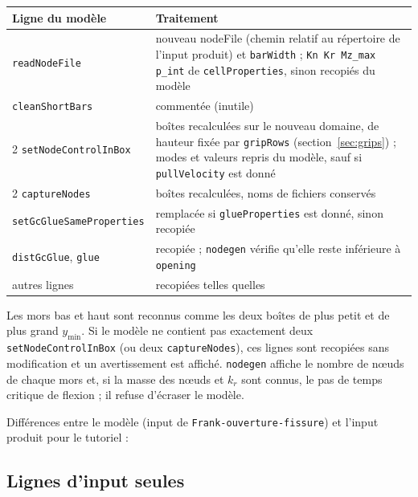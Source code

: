 \documentclass[11pt,a4paper]{article}
\newcommand{\code}[1]{\texttt{#1}}
\newcommand{\toolgen}{\code{nodegen}}
\begin{document}
\begin{center}
\small
\begin{tabular}{@{}lp{10.4cm}@{}}
  \toprule
  Ligne du modèle & Traitement \\
  \midrule
  \code{readNodeFile} & nouveau nodeFile (chemin relatif au répertoire de l'input produit) et \code{barWidth} ;
    \code{Kn Kr Mz\_max p\_int} de \code{cellProperties}, sinon recopiés du modèle \\
  \code{cleanShortBars} & commentée (inutile) \\
  2 \code{setNodeControlInBox} & boîtes recalculées sur le nouveau domaine, de hauteur fixée par \code{gripRows}
    (section~\ref{sec:grips}) ; modes et valeurs repris du modèle, sauf si \code{pullVelocity} est donné \\
  2 \code{captureNodes} & boîtes recalculées, noms de fichiers conservés \\
  \code{setGcGlueSameProperties} & remplacée si \code{glueProperties} est donné, sinon recopiée \\
  \code{distGcGlue}, \code{glue} & recopiée ; \toolgen{} vérifie qu'elle reste inférieure à \code{opening} \\
  autres lignes & recopiées telles quelles \\
  \bottomrule
\end{tabular}
\end{center}

Les mors bas et haut sont reconnus comme les deux boîtes de plus petit et de plus grand $y_{\min}$. Si le modèle ne
contient pas exactement deux \code{setNodeControlInBox} (ou deux \code{captureNodes}), ces lignes sont recopiées
sans modification et un avertissement est affiché. \toolgen{} affiche le nombre de nœuds de chaque mors et, si la
masse des nœuds et $k_r$ sont connus, le pas de temps critique de flexion ; il refuse d'écraser le modèle.

Différences entre le modèle (input de \code{Frank-ouverture-fissure}) et l'input produit pour le tutoriel :



\subsection{Lignes d'input seules}
\end{document}
